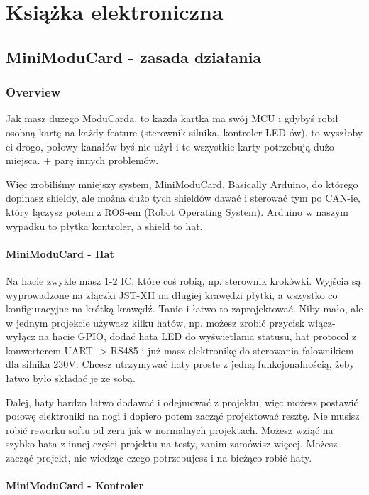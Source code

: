\documentclass[b5paper, 10pt, twoside]{book}
\begin{document}
\chapter{Książka elektroniczna}
\section{MiniModuCard - zasada działania} \label{MiniModuCard - zasada działania}
\subsection{Overview}
Jak masz dużego ModuCarda, to każda kartka ma swój MCU i gdybyś robił osobną kartę na każdy feature (sterownik silnika, kontroler LED-ów), to wyszłoby ci drogo, połowy kanałów byś nie użył i te wszystkie karty potrzebują dużo miejsca. + parę innych problemów.

Więc zrobiliśmy mniejszy system, MiniModuCard. Basically Arduino, do którego dopinasz shieldy, ale można dużo tych shieldów dawać i sterować tym po CAN-ie, który łączysz potem z ROS-em (Robot Operating System). Arduino w naszym wypadku to płytka kontroler, a shield to hat.

\subsubsection{MiniModuCard - Hat}

Na hacie zwykle masz 1-2 IC, które coś robią, np. sterownik krokówki. Wyjścia są wyprowadzone na złączki JST-XH na długiej krawędzi płytki, a wszystko co konfiguracyjne na krótką krawędź. Tanio i łatwo to zaprojektować. Niby mało, ale w jednym projekcie używasz kilku hatów, np. możesz zrobić przycisk włącz-wyłącz na hacie GPIO, dodać hata LED do wyświetlania statusu, hat protocol z konwerterem UART -> RS485 i już masz elektronikę do sterowania falownikiem dla silnika 230V. Chcesz utrzymywać haty proste z jedną funkcjonalnością, żeby łatwo było składać je ze sobą.

Dalej, haty bardzo łatwo dodawać i odejmować z projektu, więc możesz postawić połowę elektroniki na nogi i dopiero potem zacząć projektować resztę. Nie musisz robić reworku softu od zera jak w normalnych projektach. Możesz wziąć na szybko hata z innej części projektu na testy, zanim zamówisz więcej. Możesz zacząć projekt, nie wiedząc czego potrzebujesz i na bieżąco robić haty.

\subsubsection{MiniModuCard - Kontroler}
\end{document}
